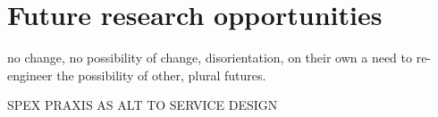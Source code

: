 


\section{Future research opportunities}



	no change, no possibility of change, disorientation, on their own
	a need to re-engineer the possibility of other, plural futures.

 SPEX PRAXIS AS ALT TO SERVICE DESIGN